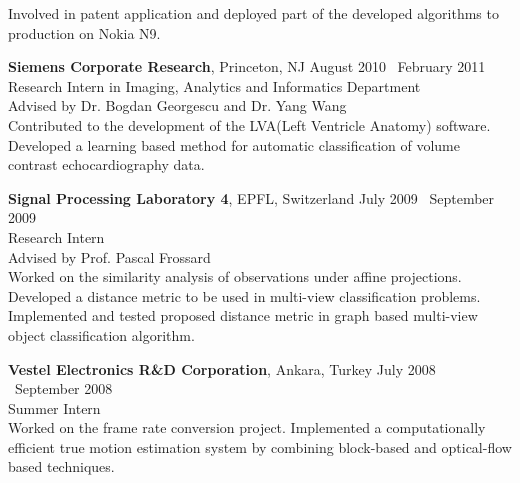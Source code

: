 \documentclass[margin,line,10pt]{resume}
\begin{document}
\begin{resume}
	Involved in patent application and deployed part of the developed algorithms to production on Nokia N9.

    \textbf{Siemens Corporate Research}, Princeton, NJ \hfill August 2010 \textendash ~February 2011\vspace{0mm}\\\vspace{0mm}
	\hspace{-1mm}Research Intern in Imaging, Analytics and Informatics Department  \hfill \vspace{0mm}\\\vspace{0mm}
	\hspace{-1mm}Advised by Dr. Bogdan Georgescu and Dr. Yang Wang \hfill \vspace{2mm}\\\vspace{0mm}
	\hspace{-1.4mm}Contributed to the development of the LVA(Left Ventricle Anatomy) software. Developed a learning based method for automatic classification of volume contrast echocardiography data.

    \textbf{Signal Processing Laboratory 4}, EPFL, Switzerland \hfill July 2009 \textendash ~September 2009\vspace{0mm}\\\vspace{0mm}
	\hspace{-1mm}Research Intern  \hfill \vspace{0mm}\\\vspace{0mm}
	\hspace{-1mm}Advised by Prof. Pascal Frossard \hfill \vspace{2mm}\\\vspace{0mm}
	\hspace{-1mm}Worked on the similarity analysis of observations under affine projections. Developed a distance metric to be used in multi-view classification problems. Implemented and tested proposed distance metric in graph based multi-view object classification algorithm.

    \hspace{-0.5mm}\textbf{Vestel Electronics R\&D Corporation}, Ankara, Turkey \hfill July 2008 \textendash ~September 2008\vspace{0mm}\\\vspace{0mm}
	\hspace{-1mm}Summer Intern  \hfill \vspace{0mm}\\\vspace{0mm}
	\hspace{-1mm}Worked on the frame rate conversion project. Implemented a computationally efficient true motion estimation system by combining block-based and optical-flow based techniques.


\end{resume}
\end{document}
